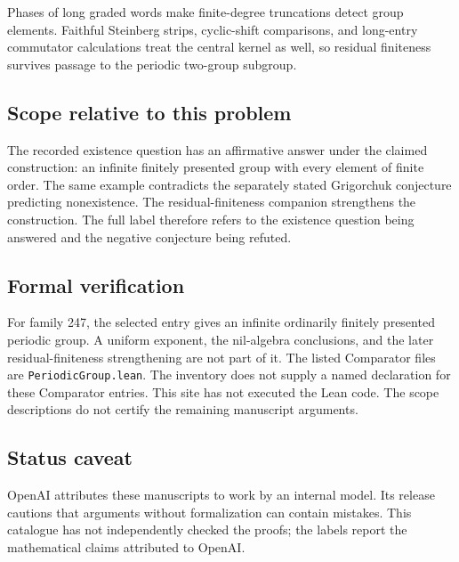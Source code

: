 \documentclass[11pt]{article}
\begin{document}
Phases of long graded words make finite-degree truncations detect group elements. Faithful Steinberg strips, cyclic-shift comparisons, and long-entry commutator calculations treat the central kernel as well, so residual finiteness survives passage to the periodic two-group subgroup.

\subsection{Scope relative to this problem}
The recorded existence question has an affirmative answer under the claimed construction: an infinite finitely presented group with every element of finite order. The same example contradicts the separately stated Grigorchuk conjecture predicting nonexistence. The residual-finiteness companion strengthens the construction. The full label therefore refers to the existence question being answered and the negative conjecture being refuted.

\subsection{Formal verification}
For family 247, the selected entry gives an infinite ordinarily finitely presented periodic group. A uniform exponent, the nil-algebra conclusions, and the later residual-finiteness strengthening are not part of it. The listed Comparator files are \texttt{PeriodicGroup.lean}. The inventory does not supply a named declaration for these Comparator entries. This site has not executed the Lean code. The scope descriptions do not certify the remaining manuscript arguments.

\subsection{Status caveat}
OpenAI attributes these manuscripts to work by an internal model. Its release cautions that arguments without formalization can contain mistakes. This catalogue has not independently checked the proofs; the labels report the mathematical claims attributed to OpenAI.
\end{document}
